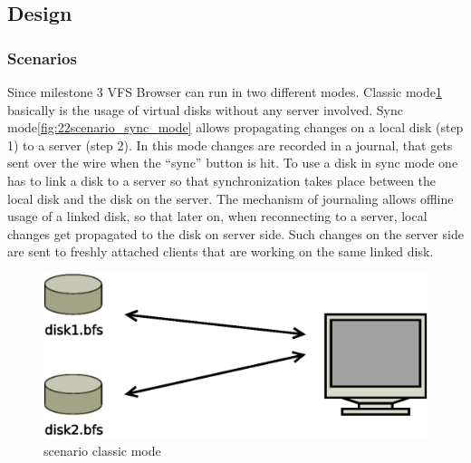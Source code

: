\subsection{Design}


\subsubsection{Scenarios}

Since milestone 3 VFS Browser can run in two different modes. Classic
mode\ref{fig:scenario_classic_mode} basically is the usage of virtual disks without any
server involved. Sync mode\ref{fig:22scenario_sync_mode} allows propagating
changes on a local disk (step 1) to a server (step 2). In
this mode changes are recorded in a journal, that gets sent over the wire when
the ``sync'' button is hit. To use a disk in sync mode one has to link a disk to
a server so that synchronization takes place between the local disk and the disk
on the server. The mechanism of journaling allows offline usage of a linked
disk, so that later on, when reconnecting to a server, local changes get
propagated to the disk on server side. Such changes on the
server side are sent to freshly attached clients that are working on the same
linked disk.

\begin{figure}[h!]
\centering
\includegraphics[width=1\textwidth]{figures/22scenario_classic_mode.eps}
\caption{scenario classic mode}
\label{fig:scenario_classic_mode}
\end{figure}

